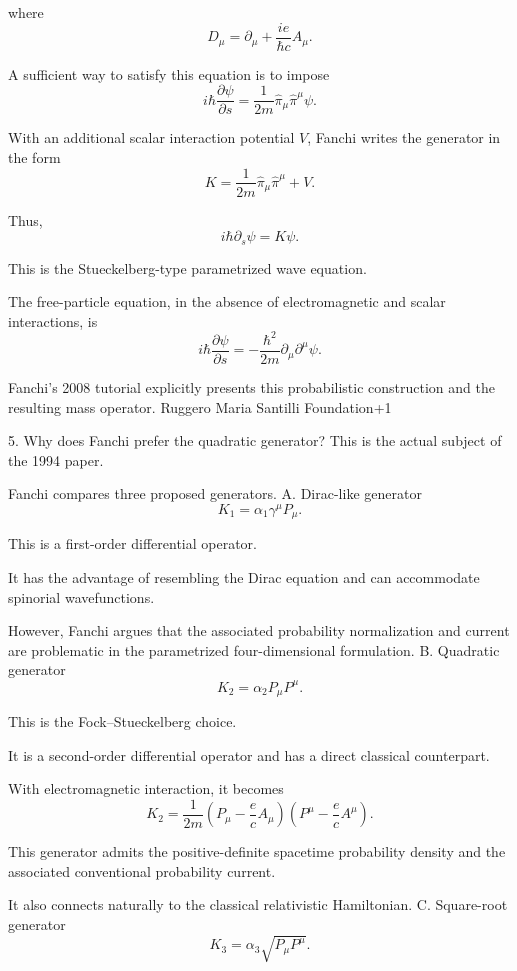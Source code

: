 where
\[
D_\mu=\partial_\mu+
\frac{ie}{\hbar c}A_\mu.
\]

A sufficient way to satisfy this equation is to impose
\[
\boxed{
i\hbar\frac{\partial\psi}{\partial s}
=
\frac{1}{2m}\hat\pi_\mu\hat\pi^\mu\psi.
}
\tag{9}
\]

With an additional scalar interaction potential \(V\), Fanchi writes the generator in the form
\[
\boxed{
K=\frac{1}{2m}\hat\pi_\mu\hat\pi^\mu+V.
}
\tag{10}
\]

Thus,
\[
\boxed{
i\hbar\partial_s\psi=K\psi.
}
\tag{11}
\]

This is the Stueckelberg-type parametrized wave equation.

The free-particle equation, in the absence of electromagnetic and scalar interactions, is
\[
i\hbar\frac{\partial\psi}{\partial s}
=
-\frac{\hbar^2}{2m}
\partial_\mu\partial^\mu\psi.
\tag{12}
\]

Fanchi's 2008 tutorial explicitly presents this probabilistic construction and the resulting mass operator. 
Ruggero Maria Santilli Foundation+1

5. Why does Fanchi prefer the quadratic generator?
This is the actual subject of the 1994 paper.

Fanchi compares three proposed generators.
A. Dirac-like generator
\[
K_1=\alpha_1\gamma^\mu P_\mu.
\tag{13}
\]

This is a first-order differential operator.

It has the advantage of resembling the Dirac equation and can accommodate spinorial wavefunctions.

However, Fanchi argues that the associated probability normalization and current are problematic in the parametrized four-dimensional formulation.
B. Quadratic generator
\[
\boxed{
K_2=\alpha_2 P_\mu P^\mu.
}
\tag{14}
\]

This is the Fock–Stueckelberg choice.

It is a second-order differential operator and has a direct classical counterpart.

With electromagnetic interaction, it becomes
\[
K_2=
\frac{1}{2m}
\left(P_\mu-\frac ec A_\mu\right)
\left(P^\mu-\frac ec A^\mu\right).
\tag{15}
\]

This generator admits the positive-definite spacetime probability density and the associated conventional probability current.

It also connects naturally to the classical relativistic Hamiltonian.
C. Square-root generator
\[
K_3=\alpha_3\sqrt{P_\mu P^\mu}.
\tag{16}
\]

